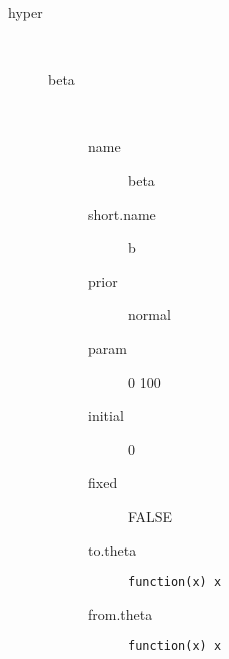 \begin{description}
	\item[hyper]\ 
	 \begin{description}
	 	\item[beta]\ 
	 	 \begin{description}
	 	 	 \item[ name ] beta 
	 	 	 \item[ short.name ] b 
	 	 	 \item[ prior ] normal 
	 	 	 \item[ param ] 0 100 
	 	 	 \item[ initial ] 0 
	 	 	 \item[ fixed ] FALSE 
	 	 	 \item[ to.theta ] \verb|function(x) x| 
	 	 	 \item[ from.theta ] \verb|function(x) x| 
	 	 \end{description}
	 \end{description}
\end{description}
